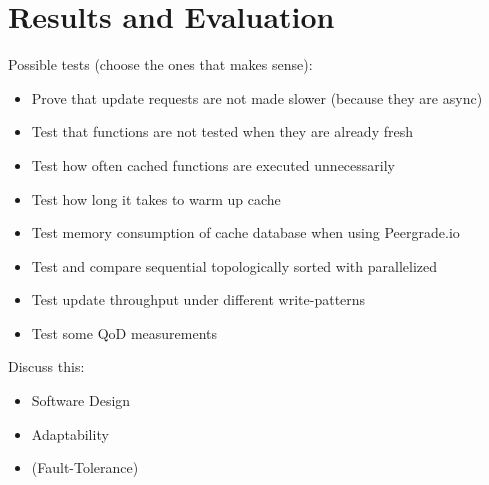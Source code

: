 \chapter{Results and Evaluation}
\label{chapter:results}

Possible tests (choose the ones that makes sense):

\begin{itemize}
  \item Prove that update requests are not made slower (because they are async)
  \item Test that functions are not tested when they are already fresh
  \item Test how often cached functions are executed unnecessarily
  \item Test how long it takes to warm up cache
  \item Test memory consumption of cache database when using Peergrade.io
  \item Test and compare sequential topologically sorted with parallelized
  \item Test update throughput under different write-patterns
  \item Test some QoD measurements
\end{itemize}

Discuss this:

\begin{itemize}
  \item Software Design
  \item Adaptability
  \item (Fault-Tolerance)
\end{itemize}



